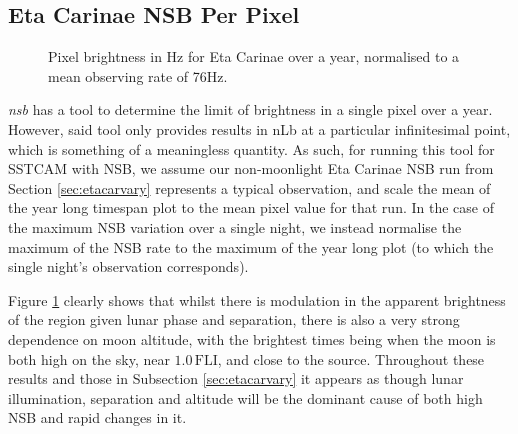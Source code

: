 \subsection{Eta Carinae NSB Per Pixel}
\label{sec:etacartimespan}
\begin{figure}[t!]
\begin{centering}
\caption{Pixel brightness in Hz for Eta Carinae over a year, normalised to a mean observing rate of 76Hz.}
\label{fig:etacar_timespan}
\end{centering}
\end{figure}

\textit{nsb} has a tool to determine the limit of brightness in a single pixel over a year. However, said tool only provides results in nLb at a particular infinitesimal point, which is something of a meaningless quantity. As such, for running this tool for SSTCAM with NSB, we assume our non-moonlight Eta Carinae NSB run from Section \ref{sec:etacarvary} represents a typical observation, and scale the mean of the year long timespan plot to the mean pixel value for that run. In the case of the maximum NSB variation over a single night, we instead normalise the maximum of the NSB rate to the maximum of the year long plot (to which the single night's observation corresponds).

Figure \ref{fig:etacar_timespan} clearly shows that whilst there is modulation in the apparent brightness of the region given lunar phase and separation, there is also a very strong dependence on moon altitude, with the brightest times being when the moon is both high on the sky, near $\mathrm{1.0\,FLI}$, and close to the source. Throughout these results and those in Subsection \ref{sec:etacarvary} it appears as though lunar illumination, separation and altitude will be the dominant cause of both high NSB and rapid changes in it.


